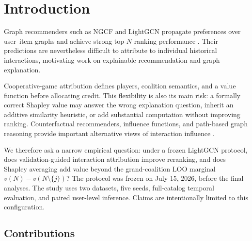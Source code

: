 \documentclass[pdflatex,sn-mathphys-num]{sn-jnl}
\begin{document}
\maketitle

\section{Introduction}\label{sec:introduction}

Graph recommenders such as NGCF and LightGCN propagate preferences over user--item graphs and achieve strong top-$N$ ranking performance \cite{wang2019ngcf,he2020lightgcn,wu2022surveygnn}. Their predictions are nevertheless difficult to attribute to individual historical interactions, motivating work on explainable recommendation \cite{zhang2020explainable} and graph explanation.

Cooperative-game attribution defines players, coalition semantics, and a value function before allocating credit. This flexibility is also its main risk: a formally correct Shapley value may answer the wrong explanation question, inherit an additive similarity heuristic, or add substantial computation without improving ranking. Counterfactual recommenders, influence functions, and path-based graph reasoning provide important alternative views of interaction influence \cite{koh2017influence,ghazimatin2020prince,tran2021counterfactual,xian2019reinforcement}.

We therefore ask a narrow empirical question: under a frozen LightGCN protocol, does validation-guided interaction attribution improve reranking, and does Shapley averaging add value beyond the grand-coalition LOO marginal $v(N)-v(N\setminus\{j\})$? The protocol was frozen on July 15, 2026, before the final analyses. The study uses two datasets, five seeds, full-catalog temporal evaluation, and paired user-level inference. Claims are intentionally limited to this configuration.

\subsection{Contributions}\label{subsec:contributions}
\end{document}

